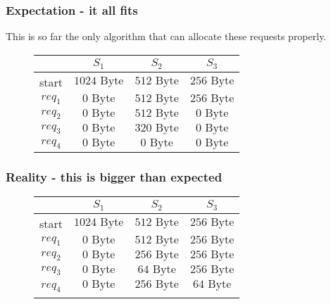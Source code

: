 \documentclass[a4paper, 11pt]{article}
\begin{document}
    \subsubsection{Expectation - it all fits}
    This is so far the only algorithm that can allocate these requests properly.
    \begin{figure}[h]
      \centering
      \begin{tabular}{|c|c|c|c|}
        \hline
        &$S_1$&$S_2$&$S_3$\\\hline
        start&$1024 \mbox{ Byte}$&$512 \mbox{ Byte}$&$256 \mbox{ Byte}$\\
        $req_1$&$0 \mbox{ Byte}$&$512 \mbox{ Byte}$&$256 \mbox{ Byte}$\\
        $req_2$&$0 \mbox{ Byte}$&$512 \mbox{ Byte}$&$0 \mbox{ Byte}$\\
        $req_3$&$0 \mbox{ Byte}$&$320 \mbox{ Byte}$&$0 \mbox{ Byte}$\\
        $req_4$&$0 \mbox{ Byte}$&$0 \mbox{ Byte}$&$0 \mbox{ Byte}$\\\hline
  
      \end{tabular}
\end{figure} 
    \newpage

    \subsubsection{Reality - this is bigger than expected}
    \begin{figure}[h]
      \centering
      \begin{tabular}{|c|c|c|c|}
        \hline
        &$S_1$&$S_2$&$S_3$\\\hline
        start&$1024 \mbox{ Byte}$&$512 \mbox{ Byte}$&$256 \mbox{ Byte}$\\
        $req_1$&$0 \mbox{ Byte}$&$512 \mbox{ Byte}$&$256 \mbox{ Byte}$\\
        $req_2$&$0 \mbox{ Byte}$&$256 \mbox{ Byte}$&$256 \mbox{ Byte}$\\
        $req_3$&$0 \mbox{ Byte}$&$64 \mbox{ Byte}$&$256 \mbox{ Byte}$\\\hline\hline
        \multirow{2}{*}{$req_4$}&$0 \mbox{ Byte}$&$256 \mbox{ Byte}$&$64 \mbox{ Byte}$\\ \cline{2-4}&\multicolumn{3}{c|}{\color{red}{Cannot fit anywhere}}\\
        \hline
  
      \end{tabular}
\end{figure}
\end{document}
